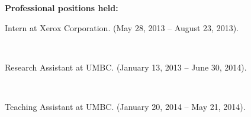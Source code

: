 \begin{titlepage}
\begin{flushleft}
	{\bf Professional positions held:}\\
	\begin{singlespace}
	{\hspace{0.4in}}\parbox[t]{5.5in}{Intern at Xerox Corporation. (May 28, 2013 -- August 23, 2013).}\\
	{\vspace{5pt}}
	{\hspace{0.4in}}\parbox[t]{5.5in}{Research Assistant at UMBC. (January 13, 2013 -- June 30, 2014).}\\
	{\vspace{5pt}}
	{\hspace{0.4in}}\parbox[t]{5.5in}{Teaching Assistant at UMBC. (January 20, 2014 -- May 21, 2014).}\\
	\end{singlespace}
\end{flushleft}
       
\end{titlepage}
\par\vfil


